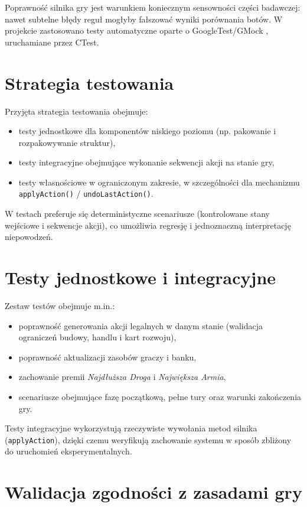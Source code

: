 \documentclass[polish,inz,longabstract]{iithesis}
\begin{document}
Poprawność silnika gry jest warunkiem koniecznym sensowności części badawczej: nawet subtelne błędy reguł mogłyby fałszować wyniki porównania botów. W projekcie zastosowano testy automatyczne oparte o GoogleTest/GMock \cite{11}, uruchamiane przez CTest.

\section{Strategia testowania}

Przyjęta strategia testowania obejmuje:

\begin{itemize}
\item testy jednostkowe dla komponentów niskiego poziomu (np. pakowanie i rozpakowywanie struktur),
\item testy integracyjne obejmujące wykonanie sekwencji akcji na stanie gry,
\item testy własnościowe w ograniczonym zakresie, w szczególności dla mechanizmu \texttt{applyAction()} / \texttt{undoLastAction()}.
\end{itemize}

W testach preferuje się deterministyczne scenariusze (kontrolowane stany wejściowe i sekwencje akcji), co umożliwia regresję i jednoznaczną interpretację niepowodzeń.

\section{Testy jednostkowe i integracyjne}

Zestaw testów obejmuje m.in.:

\begin{itemize}
\item poprawność generowania akcji legalnych w danym stanie (walidacja ograniczeń budowy, handlu i kart rozwoju),
\item poprawność aktualizacji zasobów graczy i banku,
\item zachowanie premii \textit{Najdłuższa Droga} i \textit{Największa Armia},
\item scenariusze obejmujące fazę początkową, pełne tury oraz warunki zakończenia gry.
\end{itemize}

Testy integracyjne wykorzystują rzeczywiste wywołania metod silnika (\texttt{applyAction}), dzięki czemu weryfikują zachowanie systemu w sposób zbliżony do uruchomień eksperymentalnych.

\section{Walidacja zgodności z zasadami gry}
\end{document}
